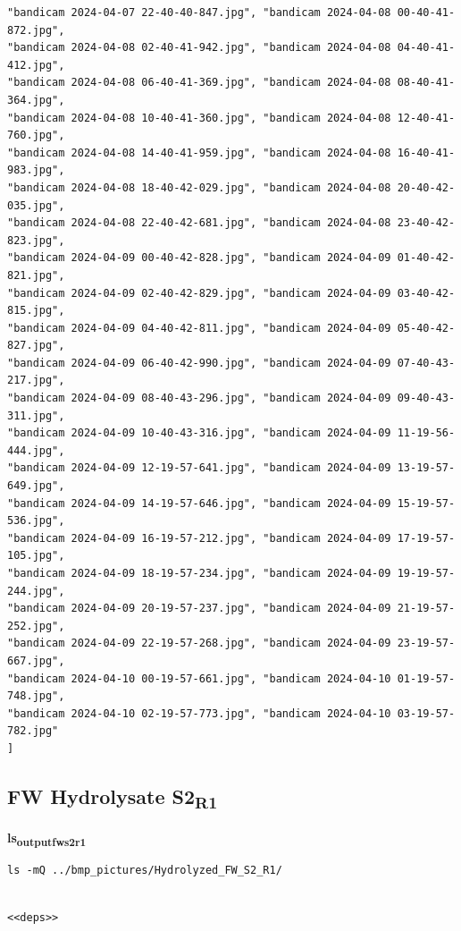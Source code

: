\documentclass[11pt]{article}
\begin{document}
\begin{verbatim}
"bandicam 2024-04-07 22-40-40-847.jpg", "bandicam 2024-04-08 00-40-41-872.jpg",
"bandicam 2024-04-08 02-40-41-942.jpg", "bandicam 2024-04-08 04-40-41-412.jpg",
"bandicam 2024-04-08 06-40-41-369.jpg", "bandicam 2024-04-08 08-40-41-364.jpg",
"bandicam 2024-04-08 10-40-41-360.jpg", "bandicam 2024-04-08 12-40-41-760.jpg",
"bandicam 2024-04-08 14-40-41-959.jpg", "bandicam 2024-04-08 16-40-41-983.jpg",
"bandicam 2024-04-08 18-40-42-029.jpg", "bandicam 2024-04-08 20-40-42-035.jpg",
"bandicam 2024-04-08 22-40-42-681.jpg", "bandicam 2024-04-08 23-40-42-823.jpg",
"bandicam 2024-04-09 00-40-42-828.jpg", "bandicam 2024-04-09 01-40-42-821.jpg",
"bandicam 2024-04-09 02-40-42-829.jpg", "bandicam 2024-04-09 03-40-42-815.jpg",
"bandicam 2024-04-09 04-40-42-811.jpg", "bandicam 2024-04-09 05-40-42-827.jpg",
"bandicam 2024-04-09 06-40-42-990.jpg", "bandicam 2024-04-09 07-40-43-217.jpg",
"bandicam 2024-04-09 08-40-43-296.jpg", "bandicam 2024-04-09 09-40-43-311.jpg",
"bandicam 2024-04-09 10-40-43-316.jpg", "bandicam 2024-04-09 11-19-56-444.jpg",
"bandicam 2024-04-09 12-19-57-641.jpg", "bandicam 2024-04-09 13-19-57-649.jpg",
"bandicam 2024-04-09 14-19-57-646.jpg", "bandicam 2024-04-09 15-19-57-536.jpg",
"bandicam 2024-04-09 16-19-57-212.jpg", "bandicam 2024-04-09 17-19-57-105.jpg",
"bandicam 2024-04-09 18-19-57-234.jpg", "bandicam 2024-04-09 19-19-57-244.jpg",
"bandicam 2024-04-09 20-19-57-237.jpg", "bandicam 2024-04-09 21-19-57-252.jpg",
"bandicam 2024-04-09 22-19-57-268.jpg", "bandicam 2024-04-09 23-19-57-667.jpg",
"bandicam 2024-04-10 00-19-57-661.jpg", "bandicam 2024-04-10 01-19-57-748.jpg",
"bandicam 2024-04-10 02-19-57-773.jpg", "bandicam 2024-04-10 03-19-57-782.jpg"
]
\end{verbatim}

\subsection{FW Hydrolysate S2\textsubscript{R1}}
\label{sec:orgac9be83}
\textbf{ls\textsubscript{output}\textsubscript{fw}\textsubscript{s2}\textsubscript{r1}}
\begin{verbatim}
ls -mQ ../bmp_pictures/Hydrolyzed_FW_S2_R1/
\end{verbatim}

\begin{verbatim}

<<deps>>

\end{verbatim}
\end{document}
